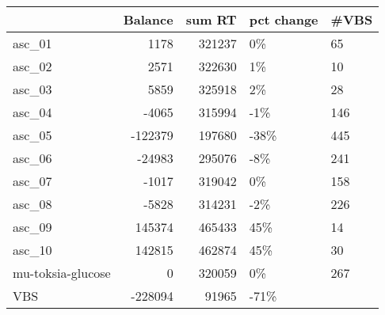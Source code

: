 \begin{tabular}{lrrll}
\toprule
{} &  Balance &  sum RT & pct change & \#VBS \\
\midrule
asc\_01            &     1178 &  321237 &         0\% &   65 \\
asc\_02            &     2571 &  322630 &         1\% &   10 \\
asc\_03            &     5859 &  325918 &         2\% &   28 \\
asc\_04            &    -4065 &  315994 &        -1\% &  146 \\
asc\_05            &  -122379 &  197680 &       -38\% &  445 \\
asc\_06            &   -24983 &  295076 &        -8\% &  241 \\
asc\_07            &    -1017 &  319042 &         0\% &  158 \\
asc\_08            &    -5828 &  314231 &        -2\% &  226 \\
asc\_09            &   145374 &  465433 &        45\% &   14 \\
asc\_10            &   142815 &  462874 &        45\% &   30 \\
mu-toksia-glucose &        0 &  320059 &         0\% &  267 \\
VBS               &  -228094 &   91965 &       -71\% &      \\
\bottomrule
\end{tabular}
